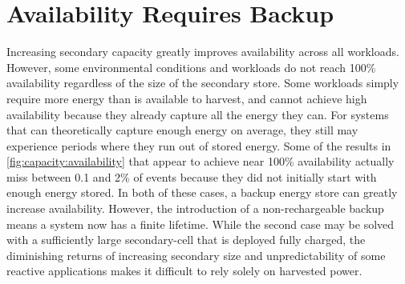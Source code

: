 \section{Availability Requires Backup}
\label{sec:capacity:primary}

Increasing secondary capacity greatly improves
availability across all workloads.
However, some environmental
conditions and workloads do not reach 100\% availability regardless of the size
of the secondary store.
Some workloads simply require more energy
than is available to harvest, and cannot achieve high availability because they already capture all the energy they can.
For systems that can theoretically capture enough energy on average, they still may experience periods where they run out of stored energy.
Some of the results in \cref{fig:capacity:availability}
that appear to achieve near 100\% availability actually miss between 0.1 and 2\% of events because they did not initially start with enough energy stored.
In both of these cases, a backup energy store can greatly increase availability.
However, the introduction of a non-rechargeable backup means a system now has a finite lifetime.
While the second case may be solved with a sufficiently large secondary-cell that is deployed fully charged, the
diminishing returns of increasing secondary size and
unpredictability of some reactive applications
makes it difficult to rely solely on harvested power.


